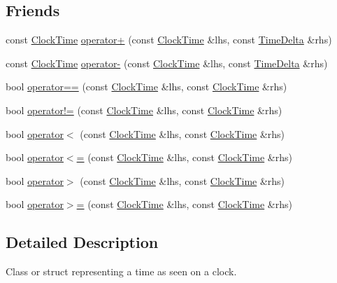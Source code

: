\subsection*{\-Friends}
\begin{DoxyCompactItemize}
\item 
const \hyperlink{structClockTime}{\-Clock\-Time} \hyperlink{structClockTime_afceb2935d4b931a097145e4967ac71b6}{operator+} (const \hyperlink{structClockTime}{\-Clock\-Time} \&lhs, const \hyperlink{structTimeDelta}{\-Time\-Delta} \&rhs)
\item 
const \hyperlink{structClockTime}{\-Clock\-Time} \hyperlink{structClockTime_a21ba0831914be0b997460299bf287cf3}{operator-\/} (const \hyperlink{structClockTime}{\-Clock\-Time} \&lhs, const \hyperlink{structTimeDelta}{\-Time\-Delta} \&rhs)
\item 
bool \hyperlink{structClockTime_a69e5484eac6807a928f087cfa84637df}{operator==} (const \hyperlink{structClockTime}{\-Clock\-Time} \&lhs, const \hyperlink{structClockTime}{\-Clock\-Time} \&rhs)
\item 
bool \hyperlink{structClockTime_a9a90069d85b56c30d69ab78e949c3911}{operator!=} (const \hyperlink{structClockTime}{\-Clock\-Time} \&lhs, const \hyperlink{structClockTime}{\-Clock\-Time} \&rhs)
\item 
bool \hyperlink{structClockTime_a1559fb2a3b03d37e75624999c9da2bc8}{operator$<$} (const \hyperlink{structClockTime}{\-Clock\-Time} \&lhs, const \hyperlink{structClockTime}{\-Clock\-Time} \&rhs)
\item 
bool \hyperlink{structClockTime_ae86e4ffa336f7ef101ab39631a143c19}{operator$<$=} (const \hyperlink{structClockTime}{\-Clock\-Time} \&lhs, const \hyperlink{structClockTime}{\-Clock\-Time} \&rhs)
\item 
bool \hyperlink{structClockTime_af8b6940e326db070a338d4adb7d54bd9}{operator$>$} (const \hyperlink{structClockTime}{\-Clock\-Time} \&lhs, const \hyperlink{structClockTime}{\-Clock\-Time} \&rhs)
\item 
bool \hyperlink{structClockTime_af2d17dcdd53d7cb57311cebe530be868}{operator$>$=} (const \hyperlink{structClockTime}{\-Clock\-Time} \&lhs, const \hyperlink{structClockTime}{\-Clock\-Time} \&rhs)
\end{DoxyCompactItemize}


\subsection{\-Detailed \-Description}
\-Class or struct representing a time as seen on a clock. 

